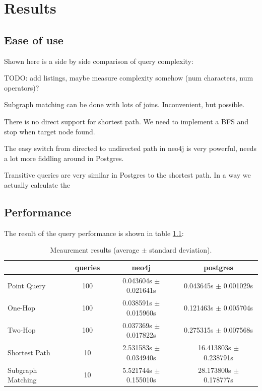 \documentclass[11pt, a4paper,oneside,chapterprefix=false]{scrbook}
\begin{document}
\chapter{Results} \label{chp:results}


\section{Ease of use} \label{sec:convenience}

Shown here is a side by side comparison of query complexity:

TODO: add listings, maybe measure complexity somehow (num characters, num operators)?

Subgraph matching can be done with lots of joins.
Inconvenient, but possible.

There is no direct support for shortest path. 
We need to implement a BFS and stop when target node found.

The easy switch from directed to undirected path in neo4j is very powerful, needs a lot more fiddling around in Postgres.

Transitive queries are very similar in Postgres to the shortest path. In a way we actually calculate the 

\section{Performance} \label{sec:performance}

The result of the query performance is shown in table \ref{table:performance}:

\begin{table}
	\begin{center}
		\begin{tabular}{ |l|c|c|c| }
			\hline
			& queries & neo4j & postgres \\
			\hline
			Point Query & 100 & 0.043604s $\pm$ 0.021641s & 0.043645s $\pm$ 0.001029s \\
			One-Hop & 100 & 0.038591s $\pm$ 0.015960s & 0.121463s $\pm$ 0.005704s \\
			Two-Hop & 100 & 0.037369s $\pm$ 0.017822s & 0.275315s $\pm$ 0.007568s \\
			Shortest Path & 10& 2.531583s $\pm$ 0.034940s & 16.413803s $\pm$ 0.238791s \\
			Subgraph Matching & 10 & 5.521744s $\pm$ 0.155010s & 28.173800s $\pm$ 0.178777s \\
			\hline
		\end{tabular}
		\caption{\label{table:performance} Meaurement results (average $\pm$ standard deviation).}
	\end{center}
\end{table}
\end{document}

